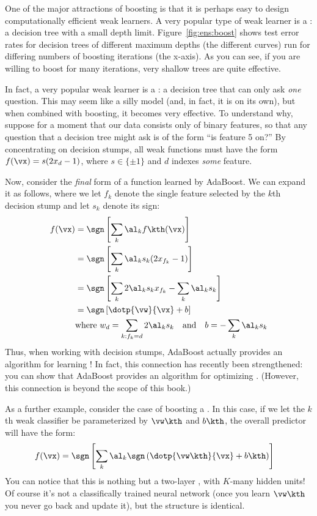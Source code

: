 
One of the major attractions of boosting is that it is perhaps easy to
design computationally efficient weak learners.  A very popular type
of weak learner is a : a decision tree
with a small depth limit.  Figure~\ref{fig:ens:boost} shows test error
rates for decision trees of different maximum depths (the different
curves) run for differing numbers of boosting iterations (the
x-axis).  As you can see, if you are willing to boost for many
iterations, very shallow trees are quite effective.

In fact, a very popular weak learner is a : a decision tree that can only ask \emph{one} question.  This
may seem like a silly model (and, in fact, it is on its own), but
when combined with boosting, it becomes very effective.  To understand
why, suppose for a moment that our data consists only of binary
features, so that any question that a decision tree might ask is of
the form ``is feature 5 on?''  By concentrating on decision stumps,
all weak functions must have the form $f(\vx) = s (2 x_d - 1)$, where
$s \in \{\pm 1\}$ and $d$ indexes \emph{some} feature.


Now, consider the \emph{final} form of a function learned by
AdaBoost.  We can expand it as follows, where we let $f_k$ denote the
single feature selected by the $k$th decision stump and let $s_k$
denote its sign:
%
\begin{align}
f(\vx)
&= \sgn\left[ \sum_k \al_k f\kth(\vx) \right] \\
&= \sgn\left[ \sum_k \al_k s_k (2 x_{f_k} - 1) \right] \\
&= \sgn\left[ \sum_k 2 \al_k s_k x_{f_k} - \sum_k \al_k s_k \right] \\
&= \sgn\left[ \dotp{\vw}{\vx} + b \right] \\
& \text{where }
w_d = \sum_{k : f_k=d} 2 \al_k s_k \quad \text{and} \quad
b   = - \sum_k \al_k s_k
\end{align}
%
Thus, when working with decision stumps, AdaBoost actually provides an
algorithm for learning !  In fact, this
connection has recently been strengthened: you can show that AdaBoost
provides an algorithm for optimizing .
(However, this connection is beyond the scope of this book.)

As a further example, consider the case of boosting a .  In this case, if we let the $k$th weak classifier be
parameterized by $\vw\kth$ and $b\kth$, the overall predictor will
have the form:
%
\begin{align}
f(\vx)
&= \sgn\left[ \sum_k \al_k \sgn\left( \dotp{\vw\kth}{\vx}+b\kth \right) \right]
\end{align}
%
You can notice that this is nothing but a two-layer , with $K$-many hidden units!  Of course it's not a
classifically trained neural network (once you learn $\vw\kth$ you
never go back and update it), but the structure is identical.

